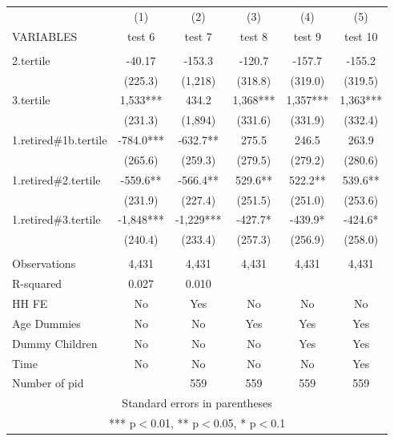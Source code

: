 \begin{tabular}{lccccc} \hline
 & (1) & (2) & (3) & (4) & (5) \\
VARIABLES & test 6 & test 7 & test 8 & test 9 & test 10 \\ \hline
 &  &  &  &  &  \\
2.tertile & -40.17 & -153.3 & -120.7 & -157.7 & -155.2 \\
 & (225.3) & (1,218) & (318.8) & (319.0) & (319.5) \\
3.tertile & 1,533*** & 434.2 & 1,368*** & 1,357*** & 1,363*** \\
 & (231.3) & (1,894) & (331.6) & (331.9) & (332.4) \\
1.retired\#1b.tertile & -784.0*** & -632.7** & 275.5 & 246.5 & 263.9 \\
 & (265.6) & (259.3) & (279.5) & (279.2) & (280.6) \\
1.retired\#2.tertile & -559.6** & -566.4** & 529.6** & 522.2** & 539.6** \\
 & (231.9) & (227.4) & (251.5) & (251.0) & (253.6) \\
1.retired\#3.tertile & -1,848*** & -1,229*** & -427.7* & -439.9* & -424.6* \\
 & (240.4) & (233.4) & (257.3) & (256.9) & (258.0) \\
 &  &  &  &  &  \\
Observations & 4,431 & 4,431 & 4,431 & 4,431 & 4,431 \\
R-squared & 0.027 & 0.010 &  &  &  \\
HH FE & No & Yes & No & No & No \\
Age Dummies & No & No & Yes & Yes & Yes \\
Dummy Children & No & No & No & Yes & Yes \\
Time & No & No & No & No & Yes \\
 Number of pid &  & 559 & 559 & 559 & 559 \\ \hline
\multicolumn{6}{c}{ Standard errors in parentheses} \\
\multicolumn{6}{c}{ *** p$<$0.01, ** p$<$0.05, * p$<$0.1} \\
\end{tabular}
